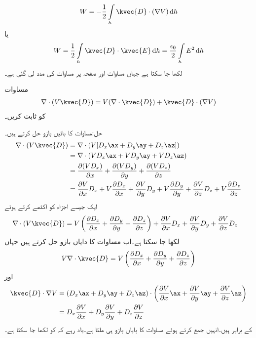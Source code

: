 \begin{align*}
W=-\frac{1}{2} \int \limits_h \kvec{D} \cdot (\nabla V) \dif h
\end{align*}
یا
\begin{align}\label{مساوات_توانائی_کثافت_تونائی_ب}
W=\frac{1}{2} \int \limits_h \kvec{D} \cdot \kvec{E} \dif h=\frac{\epsilon_0}{2}\int \limits_h  E^2 \dif h
\end{align}
لکھا جا سکتا ہے جہاں  مساوات  اور صفحہ  پر مساوات  کی مدد لی گئی ہے۔

مساوات 
\begin{align*}
\nabla \cdot  (V \kvec{D})=V (\nabla \cdot \kvec{D})+\kvec{D} \cdot (\nabla V)
\end{align*}
 کو ثابت کریں۔

حل:مساوات  کا بائیں بازو حل کرتے ہیں۔
\begin{align*}
\nabla \cdot (V \kvec{D})&=\nabla \cdot (V[D_x\ax+D_y\ay+D_z\az])\\
&=\nabla \cdot (V D_x\ax+V D_y\ay+VD_z\az)\\
&=\frac{\partial (V D_x)}{\partial x}+\frac{\partial (V D_y)}{\partial y}+\frac{\partial (V D_z)}{\partial z}\\
&=\frac{\partial V}{\partial x} D_x +V\frac{\partial D_x}{\partial x}+\frac{\partial V}{\partial y} D_y +V\frac{\partial D_y}{\partial y}+\frac{\partial V}{\partial z} D_z +V\frac{\partial D_z}{\partial z}
\end{align*}
ایک جیسے اجزاء کو اکٹھے کرتے ہوئے
\begin{align*}
\nabla \cdot (V \kvec{D})&=V\left(\frac{\partial D_x}{\partial x}+\frac{\partial D_y}{\partial y}+\frac{\partial D_z}{\partial z}\right)+\frac{\partial V}{\partial x} D_x +\frac{\partial V}{\partial y} D_y +\frac{\partial V}{\partial z} D_z 
\end{align*}
لکھا جا سکتا ہے۔اب مساوات  کا دایاں بازو حل کرتے ہیں جہاں 
\begin{align*}
V \nabla \cdot \kvec{D}=V \left(\frac{\partial D_x}{\partial x}+\frac{\partial D_y}{\partial y}+\frac{\partial D_z}{\partial z} \right)
\end{align*}
اور
\begin{align*}
\kvec{D} \cdot \nabla V&=(D_x\ax+D_y\ay+D_z\az) \cdot \left(\frac{\partial V}{\partial x}\ax +\frac{\partial V}{\partial y}\ay+\frac{\partial V}{\partial z}\az\right)\\
&= D_x\frac{\partial V}{\partial x} + D_y\frac{\partial V}{\partial y} +D_z\frac{\partial V}{\partial z}  
\end{align*}
کے برابر ہیں۔انہیں جمع کرتے ہوئے مساوات  کا بایاں بازو ہی ملتا ہے۔یاد رہے کہ  کو  لکھا جا سکتا  ہے۔

